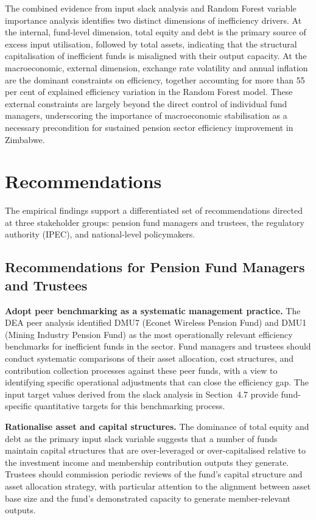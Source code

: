 \documentclass[12pt,a4paper]{article}
\begin{document}
The combined evidence from input slack analysis and Random Forest variable importance analysis identifies two distinct dimensions of inefficiency drivers. At the internal, fund-level dimension, total equity and debt is the primary source of excess input utilisation, followed by total assets, indicating that the structural capitalisation of inefficient funds is misaligned with their output capacity. At the macroeconomic, external dimension, exchange rate volatility and annual inflation are the dominant constraints on efficiency, together accounting for more than 55 per cent of explained efficiency variation in the Random Forest model. These external constraints are largely beyond the direct control of individual fund managers, underscoring the importance of macroeconomic stabilisation as a necessary precondition for sustained pension sector efficiency improvement in Zimbabwe.

\section{Recommendations}

The empirical findings support a differentiated set of recommendations directed at three stakeholder groups: pension fund managers and trustees, the regulatory authority (IPEC), and national-level policymakers.

\subsection{Recommendations for Pension Fund Managers and Trustees}

\textbf{Adopt peer benchmarking as a systematic management practice.} The DEA peer analysis identified DMU7 (Econet Wireless Pension Fund) and DMU1 (Mining Industry Pension Fund) as the most operationally relevant efficiency benchmarks for inefficient funds in the sector. Fund managers and trustees should conduct systematic comparisons of their asset allocation, cost structures, and contribution collection processes against these peer funds, with a view to identifying specific operational adjustments that can close the efficiency gap. The input target values derived from the slack analysis in Section~4.7 provide fund-specific quantitative targets for this benchmarking process.

\textbf{Rationalise asset and capital structures.} The dominance of total equity and debt as the primary input slack variable suggests that a number of funds maintain capital structures that are over-leveraged or over-capitalised relative to the investment income and membership contribution outputs they generate. Trustees should commission periodic reviews of the fund's capital structure and asset allocation strategy, with particular attention to the alignment between asset base size and the fund's demonstrated capacity to generate member-relevant outputs.
\end{document}
